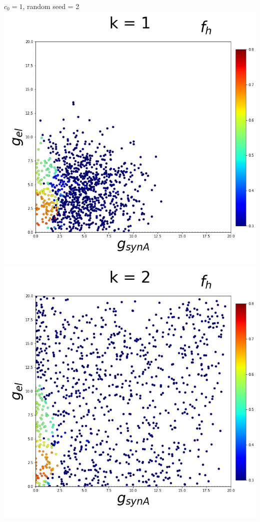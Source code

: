 \documentclass[11pt]{article}
\begin{document}
\begin{center}
{\Large $c_0 = 1$, random seed = 2} \\
\includegraphics[scale=0.125]{DSN_figs/STGCircuit_DSN_c=0_rs=2_k=1.png}
\includegraphics[scale=0.125]{DSN_figs/STGCircuit_DSN_c=0_rs=2_k=2.png}

\end{center}
\end{document}
